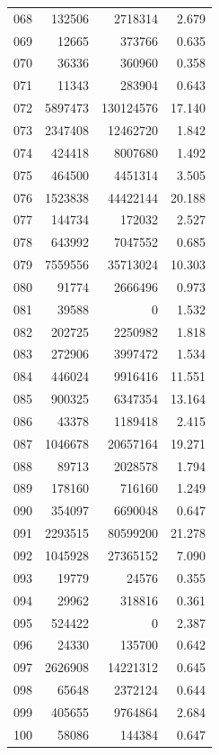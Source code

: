 \documentclass[anonymous,notoc]{gmcm2026}
\begin{document}
\begin{longtable}{lrrr}
068 & 132506 & 2718314 & 2.679 \\
069 & 12665 & 373766 & 0.635 \\
070 & 36336 & 360960 & 0.358 \\
071 & 11343 & 283904 & 0.643 \\
072 & 5897473 & 130124576 & 17.140 \\
073 & 2347408 & 12462720 & 1.842 \\
074 & 424418 & 8007680 & 1.492 \\
075 & 464500 & 4451314 & 3.505 \\
076 & 1523838 & 44422144 & 20.188 \\
077 & 144734 & 172032 & 2.527 \\
078 & 643992 & 7047552 & 0.685 \\
079 & 7559556 & 35713024 & 10.303 \\
080 & 91774 & 2666496 & 0.973 \\
081 & 39588 & 0 & 1.532 \\
082 & 202725 & 2250982 & 1.818 \\
083 & 272906 & 3997472 & 1.534 \\
084 & 446024 & 9916416 & 11.551 \\
085 & 900325 & 6347354 & 13.164 \\
086 & 43378 & 1189418 & 2.415 \\
087 & 1046678 & 20657164 & 19.271 \\
088 & 89713 & 2028578 & 1.794 \\
089 & 178160 & 716160 & 1.249 \\
090 & 354097 & 6690048 & 0.647 \\
091 & 2293515 & 80599200 & 21.278 \\
092 & 1045928 & 27365152 & 7.090 \\
093 & 19779 & 24576 & 0.355 \\
094 & 29962 & 318816 & 0.361 \\
095 & 524422 & 0 & 2.387 \\
096 & 24330 & 135700 & 0.642 \\
097 & 2626908 & 14221312 & 0.645 \\
098 & 65648 & 2372124 & 0.644 \\
099 & 405655 & 9764864 & 2.684 \\
100 & 58086 & 144384 & 0.647 \\
\end{longtable}
\end{document}
